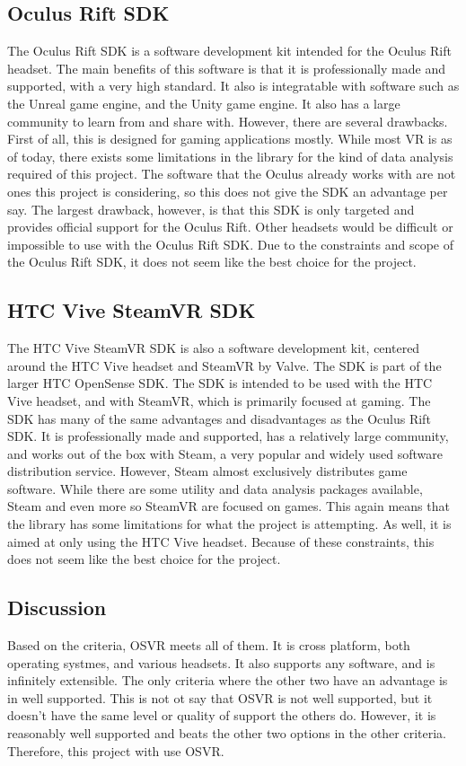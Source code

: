 \documentclass{article}
\begin{document}
\subsection{Oculus Rift SDK} 

The Oculus Rift SDK is a software development kit intended for the Oculus Rift headset.
The main benefits of this software is that it is professionally made and supported, with
a very high standard. It also is integratable with software such as the Unreal game engine,
and the Unity game engine. It also has a large community to learn from and share with. However,
there are several drawbacks. First of all, this is designed for gaming applications mostly. While most
VR is as of today, there exists some limitations in the library for the kind of data analysis required of
this project. The software that the Oculus already works with are not ones this project is considering,
so this does not give the SDK an advantage per say. The largest drawback, however, 
is that this SDK is only targeted and provides official support for the Oculus Rift. 
Other headsets would be difficult or impossible to use with the Oculus Rift SDK.
Due to the constraints and scope of the Oculus Rift SDK, it does not seem like the best choice for the
project. \cite{oculussoft}


\subsection{HTC Vive SteamVR SDK}

The HTC Vive SteamVR SDK is also a software development kit, centered around the HTC Vive headset
and SteamVR by Valve. The SDK is part of the larger HTC OpenSense SDK. The SDK is intended to be used
with the HTC Vive headset, and with SteamVR, which is primarily focused at gaming. The SDK has many
of the same advantages and disadvantages as the Oculus Rift SDK. It is professionally made and supported,
has a relatively large community, and works out of the box with Steam, a very popular and widely used
software distribution service. However, Steam almost exclusively distributes game software. While there
are some utility and data analysis packages available, Steam and even more so SteamVR are focused on
games. This again means that the library has some limitations for what the project is attempting. As well,
it is aimed at only using the HTC Vive headset. Because of these constraints, this does not seem like the
best choice for the project. \cite{htcsoft}

\subsection{Discussion}
Based on the criteria, OSVR meets all of them. It is cross platform, both operating systmes, and
various headsets. It also supports any software, and is infinitely extensible. The only criteria
where the other two have an advantage is in well supported. This is not ot say that OSVR is not
well supported, but it doesn't have the same level or quality of support the others do. However,
it is reasonably well supported and beats the other two options in the other criteria. Therefore,
this project with use OSVR.
\end{document}
